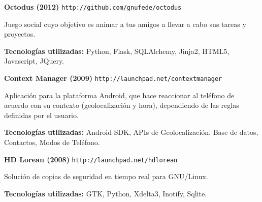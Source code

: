 \documentclass[margin,line]{resume}
\begin{document}
\begin{resume}
\begin{list1}
\vspace*{.09in}
\item[] {\bf Octodus (2012)}
 { \tt http://github.com/gnufede/octodus}

Juego social cuyo objetivo es animar a tus amigos a llevar a cabo sus tareas y proyectos.
\vspace*{.03in}
\begin{list2}
\item {\bf Tecnologías utilizadas:} Python, Flask, SQLAlchemy, Jinja2, HTML5, Javascript, JQuery.
\end{list2}

\vspace*{.09in}
\item[] {\bf Context Manager (2009)}
 { \tt http://launchpad.net/contextmanager}

Aplicación para la plataforma Android, que hace reaccionar al teléfono de acuerdo con su contexto (geolocalización y hora), dependiendo de las reglas definidas por el usuario.
\vspace*{.03in}
\begin{list2}
\item {\bf Tecnologías utilizadas:} Android SDK, APIs de Geolocalización, Base de datos,
Contactos, Modos de Teléfono.
\end{list2}

\vspace*{.09in}
\item[] {\bf HD Lorean (2008)}
 { \tt http://launchpad.net/hdlorean}

Solución de copias de seguridad en tiempo real para GNU/Linux.
\vspace*{.03in}
\begin{list2}
\item {\bf Tecnologías utilizadas:} GTK, Python, Xdelta3, Inotify, Sqlite.\\
\end{list2} 

\end{list1}


\end{resume}
\end{document}
